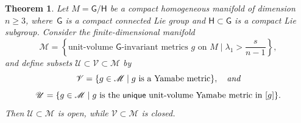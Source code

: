 \documentclass[10pt,a4paper]{amsart}
\numberwithin{equation}{section}
\newtheorem{Theorem}{Theorem}[section]
\begin{document}
\begin{Theorem} Let $M= \mathsf{G}/\mathsf{H}$ be a compact homogeneous manifold of dimension $n \geq 3$, where~$\mathsf{G}$ is a compact connected
Lie group and
$\mathsf{H}\subset \mathsf{G}$ is a compact Lie subgroup. Consider the finite-dimensional manifold
\begin{equation*}
\mathscr{M} = \left\{ \text{unit-volume $\mathsf{G}$-invariant metrics } g \text{ on } M \mid \lambda_1 > \frac{s}{n-1} \right\},
\end{equation*}
and define subsets $\mathscr{U}\subset \mathscr{V}\subset \mathscr{M}$ by
\begin{equation*}
\mathscr{V} = \{ g \in \mathscr{M} \mid g \text{ is a Yamabe metric} \},\quad \text{\em and}
\end{equation*}
\begin{equation*}
\mathscr{U} = \{ g \in \mathscr{M} \mid g \text{ is the {\sf unique} unit-volume Yamabe metric in } [g]\}.
\end{equation*}
Then $\mathscr{U}\subset\mathscr{M}$ is open, while $\mathscr{V}\subset \mathscr{M}$ is closed.
\end{Theorem}
\end{document}
